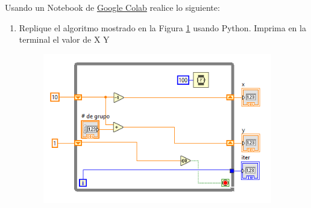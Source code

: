 \documentclass[12pt]{article}
\begin{document}
\setlength{\parindent}{0em}

Usando un Notebook de \href{https://colab.research.google.com/}{Google Colab} realice lo siguiente:

\begin{enumerate}
    \item Replique el algoritmo mostrado en la Figura \ref{fig:while} usando Python. Imprima en la terminal el valor de X Y 
    \begin{figure}[H]
        \centering
        \includegraphics[width=10cm]{fig/t1.1.png}
        \label{fig:while}
    \end{figure}


\end{enumerate}




% 
% 
\end{document}
